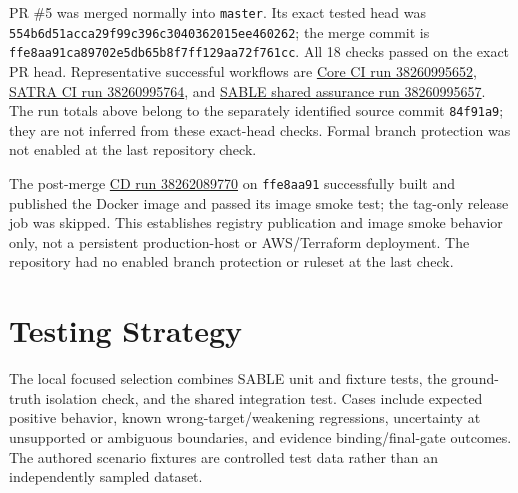 PR \#5 was merged normally into \texttt{master}. Its exact tested head was \texttt{554b6d51ac\allowbreak{}ca29f99c39\allowbreak{}6c30403620\allowbreak{}15ee460262}; the merge commit is \texttt{ffe8aa91ca\allowbreak{}89702e5db6\allowbreak{}5b8f7ff129\allowbreak{}aa72f761cc}. All 18 checks passed on the exact PR head. Representative successful workflows are \href{https://github.com/SheharyarAli-Dev/Working-POC/actions/runs/38260995652}{Core CI run 38260995652}, \href{https://github.com/SheharyarAli-Dev/Working-POC/actions/runs/38260995764}{SATRA CI run 38260995764}, and \href{https://github.com/SheharyarAli-Dev/Working-POC/actions/runs/38260995657}{SABLE shared assurance run 38260995657}. The run totals above belong to the separately identified source commit \texttt{84f91a9}; they are not inferred from these exact-head checks. Formal branch protection was not enabled at the last repository check.

The post-merge \href{https://github.com/SheharyarAli-Dev/Working-POC/actions/runs/38262089770}{CD run 38262089770} on \texttt{ffe8aa91} successfully built and published the Docker image and passed its image smoke test; the tag-only release job was skipped. This establishes registry publication and image smoke behavior only, not a persistent production-host or AWS/Terraform deployment. The repository had no enabled branch protection or ruleset at the last check.

\section{Testing Strategy}
The local focused selection combines SABLE unit and fixture tests, the ground-truth isolation check, and the shared integration test. Cases include expected positive behavior, known wrong-target/weakening regressions, uncertainty at unsupported or ambiguous boundaries, and evidence binding/final-gate outcomes. The authored scenario fixtures are controlled test data rather than an independently sampled dataset.

